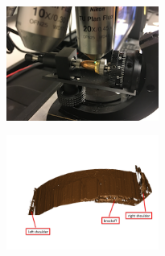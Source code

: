 \documentclass[varwidth]{standalone}
\begin{document}
\begin{figure}
  \begin{subfigure}{6cm}
    \centering\includegraphics[width=5cm]{../images/microscope-small}
  \end{subfigure}
  \begin{subfigure}{6cm}
    \centering\includegraphics[width=5cm]{../images/HS44-Br1-B1-L2-annotated}
  \end{subfigure}
\end{figure}
 
\end{document}
